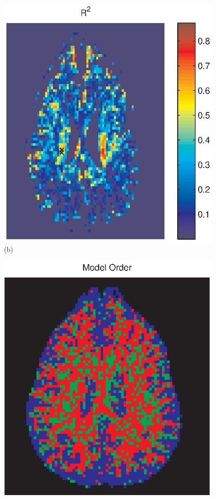 \documentclass[authoryear,preprint,12pt]{elsarticle}
\begin{document}
\begin{figure}[p]
\begin{center}
\begin{minipage}[]{.30\textwidth}
      \includegraphics[width=\textwidth]{Rsqnew1typ2.eps}
       (b)
      \end{minipage}
      \begin{minipage}[]{.30\textwidth}
      \centering
      \includegraphics[width=\textwidth]{modelorderchosen2.eps}

\end{minipage}
\end{center}
\end{figure}
\end{document}
